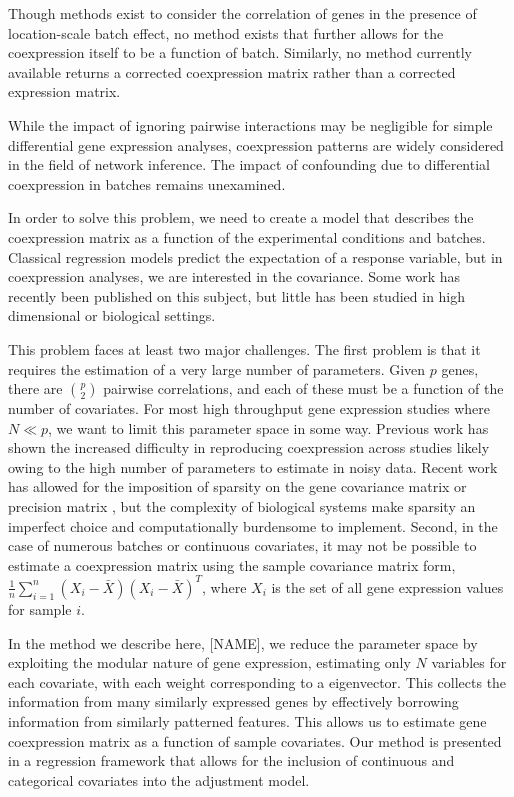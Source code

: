 Though methods exist to consider the correlation of genes in the presence
of location-scale batch effect, no method exists that further allows
for the coexpression itself to be a function of batch. Similarly,
no method currently available returns a corrected coexpression matrix
rather than a corrected expression matrix.

While the impact of ignoring pairwise interactions may be negligible
for simple differential gene expression analyses, coexpression patterns
are widely considered in the field of network inference\cite{de2010differential,chen2011removing,fukushima2013diffcorr}.
The impact of confounding due to differential coexpression in batches
remains unexamined.

In order to solve this problem, we need to create a model that describes
the coexpression matrix as a function of the experimental conditions
and batches. Classical regression models predict the expectation of
a response variable, but in coexpression analyses, we are interested
in the covariance. Some work has recently been published on this subject\cite{hoff2012covariance},
but little has been studied in high dimensional or biological settings. 

This problem faces at least two major challenges. The first problem
is that it requires the estimation of a very large number of parameters.
Given $p$ genes, there are ${p \choose 2}$ pairwise correlations,
and each of these must be a function of the number of covariates.
For most high throughput gene expression studies where $N\ll p$,
we want to limit this parameter space in some way. Previous work has
shown the increased difficulty in reproducing coexpression across
studies\cite{schlauch2016estimating} likely owing to the high number
of parameters to estimate in noisy data. Recent work has allowed for
the imposition of sparsity on the gene covariance matrix \cite{bien2011sparse}
or precision matrix \cite{friedman2008sparse}, but the complexity
of biological systems make sparsity an imperfect choice and computationally
burdensome to implement. Second, in the case of numerous batches or
continuous covariates, it may not be possible to estimate a coexpression
matrix using the sample covariance matrix form, $\frac{1}{n}\sum_{i=1}^{n}\left(X_{i}-\bar{X}\right)\left(X_{i}-\bar{X}\right)^{T}$,
where $X_{i}$ is the set of all gene expression values for sample
$i$. 

In the method we describe here, {[}NAME{]}, we reduce the parameter
space by exploiting the modular nature of gene expression, estimating
only $N$ variables for each covariate, with each weight corresponding
to a eigenvector. This collects the information from many similarly
expressed genes by effectively borrowing information from similarly
patterned features. This allows us to estimate gene coexpression matrix
as a function of sample covariates. Our method is presented in a regression
framework that allows for the inclusion of continuous and categorical
covariates into the adjustment model.


